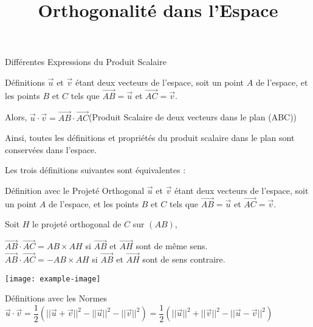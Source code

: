 \documentclass{cours}
\title{Orthogonalité dans l'Espace}
\begin{document}

    \begin{Gpartie}{Différentes Expressions du Produit Scalaire} 
        \begin{Spartie}{Définitions} 
            $\vec{u}$ et $\vec{v}$ étant deux vecteurs de l'espace, soit un point $A$ de l'espace, et les points $B$ et $C$ tels que $\overrightarrow{AB}=\vec{u}$ et $\overrightarrow{AC}=\vec{v}$.

            Alors, $\vec{u}\cdot\vec{v}=\overrightarrow{AB}\cdot\overrightarrow{AC}$\quad(Produit Scalaire de deux vecteurs dans le plan (ABC))

            Ainsi, toutes les définitions et propriétés du produit scalaire dans le plan sont conservées dans l'espace.

            Les trois définitions suivantes sont équivalentes :
            \begin{SSpartie}{Définition avec le Projeté Orthogonal} 
                $\vec{u}$ et $\vec{v}$ étant deux vecteurs de l'espace, soit un point $A$ de l'espace, et les points $B$ et $C$ tels que $\overrightarrow{AB}=\vec{u}$ et $\overrightarrow{AC}=\vec{v}$.

                Soit $H$ le projeté orthogonal de $C$ sur $(AB)$,

                $\overrightarrow{AB}\cdot\overrightarrow{AC}=AB\times AH$ si $\overrightarrow{AB}$ et $\overrightarrow{AH}$ sont de même sens. \\
                $\overrightarrow{AB}\cdot\overrightarrow{AC}=-AB\times AH$ si $\overrightarrow{AB}$ et $\overrightarrow{AH}$ sont de sens contraire.
                \begin{center}
                        \texttt{[image: example-image]}
                    \parbox{\linewidth}{}
                \end{center}
            \end{SSpartie}
            \begin{SSpartie}{Définitions avec les Normes} 
                $\vec{u}\cdot\vec{v}=\dfrac{1}{2}\left(\lvert\lvert\vec{u}+\vec{v}\rvert\rvert^2-\lvert\lvert\vec{u}\rvert\rvert^2-\lvert\lvert\vec{v}\rvert\rvert^2\right)=\dfrac{1}{2}\left(\lvert\lvert\vec{u}\rvert\rvert^2+\lvert\lvert\vec{v}\rvert\rvert^2-\lvert\lvert\vec{u}-\vec{v}\rvert\rvert^2\right)$


\end{SSpartie}
\end{Spartie}
\end{Gpartie}
\end{document}
